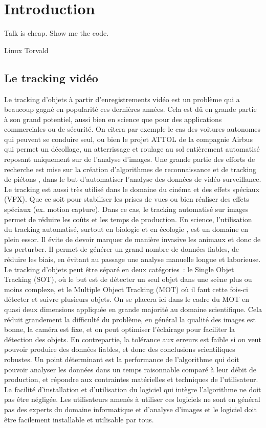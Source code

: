 \chapter{Introduction}

  \epigraph{Talk is cheap. Show me the code.}{Linux Torvald}

	\section{Le tracking vidéo}
	
  Le tracking d'objets à partir d'enregistrements vidéo est un problème qui a beaucoup gagné en popularité ces dernières années. Cela est dû en grande partie à son grand potentiel, aussi bien en science que pour des applications commerciales ou de sécurité. On citera par exemple le cas des voitures autonomes \cite{viswanathan2017applications} qui peuvent se conduire seul, ou bien le projet ATTOL \cite{ATTOL} de la compagnie Airbus qui permet un décollage, un atterrissage et roulage au sol entièrement automatisé reposant uniquement sur de l'analyse d'images. Une grande partie des efforts de recherche est mise sur la création d'algorithmes de reconnaissance et de tracking de piétons \cite{}, dans le but d'automatiser l'analyse des données de vidéo surveillance. Le tracking est aussi très utilisé dans le domaine du cinéma et des effets spéciaux (VFX). Que ce soit pour stabiliser les prises de vues ou bien réaliser des effets spéciaux (ex. motion capture). Dans ce cas, le tracking automatisé sur images permet de réduire les coûts et les temps de production. En science, l'utilisation du tracking automatisé, surtout en biologie et en écologie \cite{dell2014automated}, est un domaine en plein essor. Il évite de devoir marquer de manière invasive les animaux et donc de les perturber. Il permet de générer un grand nombre de données fiables, de réduire les biais, en évitant au passage une analyse manuelle longue et laborieuse.
\medbreak
  Le tracking d'objets peut être séparé en deux catégories : le Single Objet Tracking (SOT), où le but est de détecter un seul objet dans une scène plus ou moins complexe, et le Multiple Object Tracking (MOT) \cite{luo2014multiple} où il faut cette fois-ci détecter et suivre plusieurs objets. On se placera ici dans le cadre du MOT en quasi deux dimensions appliquée en grande majorité au domaine scientifique. Cela réduit grandement la difficulté du problème, en général la qualité des images est bonne, la caméra est fixe, et on peut optimiser l'éclairage pour faciliter la détection des objets. En contrepartie, la tolérance aux erreurs est faible si on veut pouvoir produire des données fiables, et donc des conclusions scientifiques robustes. Un point déterminant est la performance de l’algorithme qui doit pouvoir analyser les données dans un temps raisonnable comparé à leur débit de production, et répondre aux contraintes matérielles et techniques de l'utilisateur. La facilité d'installation et d'utilisation du logiciel qui intègre l’algorithme ne doit pas être négligée. Les utilisateurs amenés à utiliser ces logiciels ne sont en général pas des experts du domaine informatique et d'analyse d'images et le logiciel doit être facilement installable et utilisable par tous.
